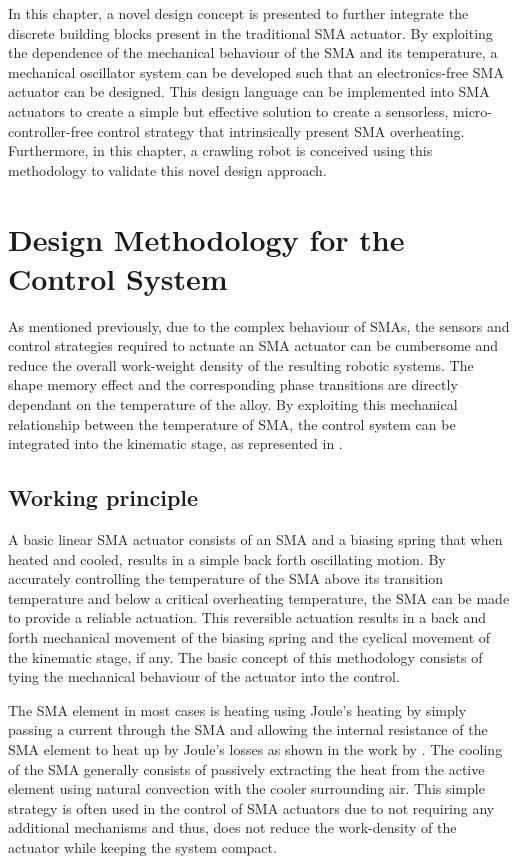 In this chapter, a novel design concept is presented to further integrate the discrete building blocks present in the traditional SMA actuator. By exploiting the dependence of the mechanical behaviour of the SMA and its temperature, a mechanical oscillator system can be developed such that an electronics-free SMA actuator can be designed. This design language can be implemented into SMA actuators to create a simple but effective solution to create a sensorless, micro-controller-free control strategy that intrinsically present SMA overheating. Furthermore, in this chapter, a crawling robot is conceived using this methodology to validate this novel design approach.

\section{Design Methodology for the Control System}
As mentioned previously, due to the complex behaviour of SMAs, the sensors and control strategies required to actuate an SMA actuator can be cumbersome and reduce the overall work-weight density of the resulting robotic systems. The shape memory effect and the corresponding phase transitions are directly dependant on the temperature of the alloy. By exploiting this mechanical relationship between the temperature of SMA, the control system can be integrated into the kinematic stage, as represented in \todocite.
\subsection{Working principle}

A basic linear SMA actuator consists of an SMA and a biasing spring that when heated and cooled, results in a simple back forth oscillating motion. By accurately controlling the temperature of the SMA above its transition temperature and below a critical overheating temperature, the SMA can be made to provide a reliable actuation. This reversible actuation results in a back and forth mechanical movement of the biasing spring and the cyclical movement of the kinematic stage, if any. The basic concept of this methodology consists of tying the mechanical behaviour of the actuator into the control.

The SMA element in most cases is heating using Joule's heating by simply passing a current through the SMA and allowing the internal resistance of the SMA element to heat up by Joule's losses as shown in the work by \todocite. The cooling of the SMA generally consists of passively extracting the heat from the active element using natural convection with the cooler surrounding air. This simple strategy is often used in the control of SMA actuators due to not requiring any additional mechanisms and thus, does not reduce the work-density of the actuator while keeping the system compact.

